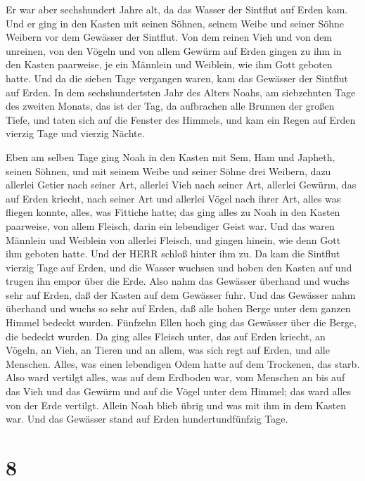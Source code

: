  Er war aber sechshundert Jahre alt, da das Wasser der
Sintflut auf Erden kam.  Und er ging in den Kasten mit
seinen Söhnen, seinem Weibe und seiner Söhne Weibern vor dem Gewässer
der Sintflut.  Von dem reinen Vieh und von dem unreinen, von
den Vögeln und von allem Gewürm auf Erden  gingen zu ihm in
den Kasten paarweise, je ein Männlein und Weiblein, wie ihm Gott geboten
hatte.  Und da die sieben Tage vergangen waren, kam das
Gewässer der Sintflut auf Erden.  In dem sechshundertsten
Jahr des Alters Noahs, am siebzehnten Tage des zweiten Monats, das ist
der Tag, da aufbrachen alle Brunnen der großen Tiefe, und taten sich auf
die Fenster des Himmels,  und kam ein Regen auf Erden
vierzig Tage und vierzig Nächte.

 Eben am selben Tage ging Noah in den Kasten mit Sem, Ham
und Japheth, seinen Söhnen, und mit seinem Weibe und seiner Söhne drei
Weibern,  dazu allerlei Getier nach seiner Art, allerlei
Vieh nach seiner Art, allerlei Gewürm, das auf Erden kriecht, nach
seiner Art und allerlei Vögel nach ihrer Art, alles was fliegen konnte,
alles, was Fittiche hatte;  das ging alles zu Noah in den
Kasten paarweise, von allem Fleisch, darin ein lebendiger Geist war.
 Und das waren Männlein und Weiblein von allerlei Fleisch,
und gingen hinein, wie denn Gott ihm geboten hatte. Und der HERR schloß
hinter ihm zu.  Da kam die Sintflut vierzig Tage auf Erden,
und die Wasser wuchsen und hoben den Kasten auf und trugen ihn empor
über die Erde.  Also nahm das Gewässer überhand und wuchs
sehr auf Erden, daß der Kasten auf dem Gewässer fuhr.  Und
das Gewässer nahm überhand und wuchs so sehr auf Erden, daß alle hohen
Berge unter dem ganzen Himmel bedeckt wurden.  Fünfzehn
Ellen hoch ging das Gewässer über die Berge, die bedeckt wurden.
 Da ging alles Fleisch unter, das auf Erden kriecht, an
Vögeln, an Vieh, an Tieren und an allem, was sich regt auf Erden, und
alle Menschen.  Alles, was einen lebendigen Odem hatte auf
dem Trockenen, das starb.  Also ward vertilgt alles, was
auf dem Erdboden war, vom Menschen an bis auf das Vieh und das Gewürm
und auf die Vögel unter dem Himmel; das ward alles von der Erde
vertilgt. Allein Noah blieb übrig und was mit ihm in dem Kasten war.
 Und das Gewässer stand auf Erden hundertundfünfzig Tage.

\hypertarget{section-7}{%
\section{8}\label{section-7}}

